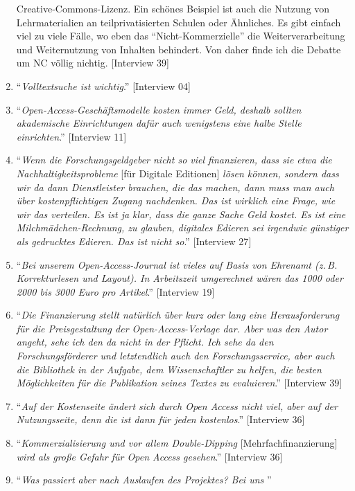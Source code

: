 \documentclass[a4paper,
fontsize=11pt,
oneside,
numbers=noperiodatend,
parskip=half-,
bibliography=totoc,
final
]{scrartcl}
\begin{document}
\begin{enumerate}
{{  Creative-Commons-Lizenz. Ein schönes Beispiel ist auch die Nutzung von
  Lehrmaterialien an teilprivatisierten Schulen oder Ähnliches. Es gibt
  einfach viel zu viele Fälle, wo eben das \enquote{Nicht-Kommerzielle}
  die Weiterverarbeitung und Weiternutzung von Inhalten behindert. Von
  daher finde ich die Debatte um NC völlig nichtig}.} {[}Interview 39{]}
\item
  \enquote{\emph{Volltextsuche ist wichtig}.} {[}Interview 04{]}
\item
  \enquote{\emph{Open-Access-Geschäftsmodelle kosten immer Geld, deshalb
  sollten akademische Einrichtungen dafür auch wenigstens eine halbe
  Stelle einrichten}.} {[}Interview 11{]}
\item
   \enquote{\emph{Wenn die Forschungsgeldgeber nicht so viel finanzieren, dass
  sie etwa die Nachhaltigkeitsprobleme} {[}für Digitale Editionen{]}
  \emph{lösen können, sondern dass wir da dann Dienstleister brauchen, die
  das machen, dann muss man auch über kostenpflichtigen Zugang
  nachdenken. Das ist wirklich eine Frage, wie wir das verteilen. Es ist
  ja klar, dass die ganze Sache Geld kostet. Es ist eine
  Milchmädchen-Rechnung, zu glauben, digitales Edieren sei irgendwie
  günstiger als gedrucktes Edieren. Das ist nicht so}.} {[}Interview
  27{]}
\item
  \enquote{\emph{Bei unserem Open-Access-Journal ist vieles auf Basis
  von Ehrenamt (z.\,B. Korrekturlesen und Layout). In Arbeitszeit
  umgerechnet wären das 1000 oder 2000 bis 3000 Euro pro Artikel}.}
  {[}Interview 19{]}
\item
  \enquote{\emph{Die Finanzierung stellt natürlich über kurz oder lang
  eine Herausforderung für die Preisgestaltung der Open-Access-Verlage
  dar. Aber was den Autor angeht, sehe ich den da nicht in der Pflicht.
  Ich sehe da den Forschungsförderer und letztendlich auch den
  Forschungsservice, aber auch die Bibliothek in der Aufgabe, dem
  Wissenschaftler zu helfen, die besten Möglichkeiten für die
  Publikation seines Textes zu evaluieren}.} {[}Interview 39{]}
\item
  \enquote{\emph{Auf der Kostenseite ändert sich durch Open Access nicht
  viel, aber auf der Nutzungsseite, denn die ist dann für jeden
  kostenlos}.} {[}Interview 36{]}
\item
  \enquote{\emph{Kommerzialisierung und vor allem Double-Dipping}
  {[}Mehrfachfinanzierung{]} \emph{wird als große Gefahr für Open Access
  gesehen}.} {[}Interview 36{]}
\item
  \enquote{\emph{Was passiert aber nach Auslaufen des Projektes? Bei uns
}}
\end{enumerate}
\end{document}
